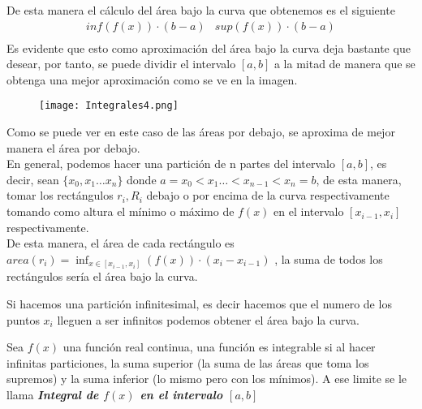 \begin{figure}[H]
\graphicspath{{imagenes_analisis/}}

\end{figure}
\noindent
De esta manera el cálculo del área bajo la curva que obtenemos es el siguiente
\begin{equation*}
\begin{array}{rr}
 inf(f(x))\cdot (b-a)& sup(f(x))\cdot(b-a)\\
\end{array}
\end{equation*}
\noindent
Es evidente que esto como aproximación del área bajo la curva deja bastante que desear, por tanto, se puede dividir el intervalo $[a,b]$ a la mitad de manera que se obtenga una mejor aproximación como se ve en la imagen.
\begin{figure}[H]
\begin{center}
\graphicspath{{imagenes_analisis/}}
\texttt{[image: Integrales4.png]}
\label{Función $f(x)$}
\end{center}
\end{figure}
\noindent
Como se puede ver en este caso de las áreas por debajo, se aproxima de mejor manera el área por debajo.\\
\noindent 
En general, podemos hacer una partición de n partes del intervalo $[a,b]$, es decir, sean $\lbrace x_0,x_1\ldots x_n\rbrace$ donde $a=x_0<x_1\ldots<x_{n-1}<x_n=b$, de esta manera, tomar los rectángulos $r_i, R_i$ debajo o por encima de la curva respectivamente tomando como altura el mínimo o máximo de $f(x)$ en el intervalo $[x_{i-1},x_{i}]$ respectivamente.\\
\noindent
De esta manera, el área de cada rectángulo es $\displaystyle area(r_i)=\inf_{x\in{[x_{i-1},x_i]}}(f(x))\cdot (x_{i}-x_{i-1})$ , la suma de todos los rectángulos sería el área bajo la curva. 

Si hacemos una partición infinitesimal, es decir hacemos que el numero de los puntos $x_i$ lleguen a ser infinitos podemos obtener el área bajo la curva. 

\begin{defi}
Sea $f(x)$ una función real continua, una función es integrable si al hacer infinitas particiones, la suma superior (la suma de las áreas que toma los supremos) y la suma inferior (lo mismo pero con los mínimos). A ese limite se le llama \textit{\textbf{Integral de $f(x)$ en el intervalo $[a,b]$}}
\end{defi}
\newpage
